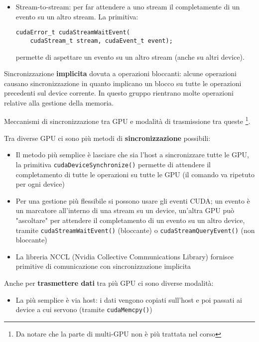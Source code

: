 \begin{questions}
\begin{solution}
\begin{itemize}
            \item Stream-to-stream: per far attendere a uno stream il completamente di un evento su un altro stream. La primitiva:
            \begin{verbatim}
cudaError_t cudaStreamWaitEvent(
    cudaStream_t stream, cudaEvent_t event);
            \end{verbatim}
            permette di aspettare un evento su un altro stream (anche su altri device).
        \end{itemize}
        
        Sincronizzazione \textbf{implicita} dovuta a operazioni bloccanti: alcune operazioni causano sincronizzazione in quanto implicano un blocco su tutte le operazioni precedenti sul device corrente. In questo gruppo rientrano molte operazioni relative alla gestione della memoria.
    \end{solution}
    
    \question Meccanismi di sincronizzazione tra GPU e modalità di trasmissione tra queste \footnote{Da notare che la parte di multi-GPU non è più trattata nel corso}.
    
    \begin{solution}
        Tra diverse GPU ci sono più metodi di \textbf{sincronizzazione} possibili: 
        \begin{itemize}
            \item Il metodo più semplice è lasciare che sia l'host a sincronizzare tutte le GPU, la primitiva \texttt{cudaDeviceSynchronize()} permette di attendere il completamento di tutte le operazioni su tutte le GPU (il comando va ripetuto per ogni device)
            
            \item Per una gestione più flessibile si possono usare gli eventi CUDA; un evento è un marcatore all'interno di una stream su un device, un'altra GPU può "ascoltare" per attendere il completamento di un evento su un altro device, tramite \texttt{cudaStreamWaitEvent()} (bloccante) o \texttt{cudaStreamQueryEvent()} (non bloccante)
            
            \item La libreria NCCL (Nvidia Collective Communications Library) fornisce primitive di comunicazione con sincronizzazione implicita
        \end{itemize}
        
        Anche per \textbf{trasmettere dati} tra più GPU ci sono diverse modalità:
        \begin{itemize}
            \item La più semplice è via host: i dati vengono copiati sull'host e poi passati ai device a cui servono (tramite \texttt{cudaMemcpy()})
            

\end{itemize}
\end{solution}
\end{questions}
